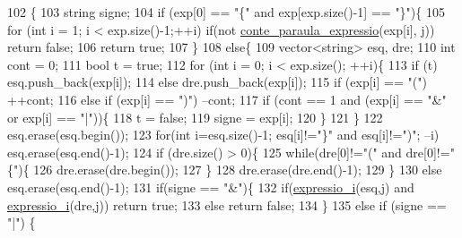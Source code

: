 \begin{DoxyCode}
102                                                       \{
103   \textcolor{keywordtype}{string} signe;
104   \textcolor{keywordflow}{if} (exp[0] == \textcolor{stringliteral}{"\{"} and exp[exp.size()-1] == \textcolor{stringliteral}{"\}"})\{
105     \textcolor{keywordflow}{for} (\textcolor{keywordtype}{int} i = 1; i < exp.size()-1;++i) \textcolor{keywordflow}{if}(not \hyperlink{class_cjt___frases_a2e262e5ddc41e193b8821d6ab48cd9f7}{conte\_paraula\_expressio}(exp[i], j))
       \textcolor{keywordflow}{return} \textcolor{keyword}{false};
106       \textcolor{keywordflow}{return} \textcolor{keyword}{true};
107   \}
108   \textcolor{keywordflow}{else}\{
109     vector<string> esq, dre;
110     \textcolor{keywordtype}{int} cont = 0;
111     \textcolor{keywordtype}{bool} t = \textcolor{keyword}{true};
112     \textcolor{keywordflow}{for} (\textcolor{keywordtype}{int} i = 0; i < exp.size(); ++i)\{
113       \textcolor{keywordflow}{if} (t) esq.push\_back(exp[i]);
114       \textcolor{keywordflow}{else} dre.push\_back(exp[i]);
115       \textcolor{keywordflow}{if} (exp[i] == \textcolor{stringliteral}{"("}) ++cont;
116       \textcolor{keywordflow}{else} \textcolor{keywordflow}{if} (exp[i] == \textcolor{stringliteral}{")"}) --cont;
117       \textcolor{keywordflow}{if} (cont == 1 and (exp[i] == \textcolor{stringliteral}{"&"} or exp[i] == \textcolor{stringliteral}{"|"}))\{
118         t = \textcolor{keyword}{false};
119         signe = exp[i];
120       \}
121     \}
122         esq.erase(esq.begin());
123     \textcolor{keywordflow}{for}(\textcolor{keywordtype}{int} i=esq.size()-1; esq[i]!=\textcolor{stringliteral}{"\}"} and esq[i]!=\textcolor{stringliteral}{")"}; --i) esq.erase(esq.end()-1);
124     \textcolor{keywordflow}{if} (dre.size() > 0)\{
125       \textcolor{keywordflow}{while}(dre[0]!=\textcolor{stringliteral}{"("} and dre[0]!=\textcolor{stringliteral}{"\{"})\{
126         dre.erase(dre.begin());
127       \}
128       dre.erase(dre.end()-1);
129     \}
130     \textcolor{keywordflow}{else} esq.erase(esq.end()-1);
131     \textcolor{keywordflow}{if}(signe == \textcolor{stringliteral}{"&"})\{
132       \textcolor{keywordflow}{if}(\hyperlink{class_cjt___frases_abb52ecadbfd3fead9e055c12f2947d04}{expressio\_i}(esq,j) and \hyperlink{class_cjt___frases_abb52ecadbfd3fead9e055c12f2947d04}{expressio\_i}(dre,j)) \textcolor{keywordflow}{return} \textcolor{keyword}{true};
133       \textcolor{keywordflow}{else} \textcolor{keywordflow}{return} \textcolor{keyword}{false};
134     \}
135     \textcolor{keywordflow}{else} \textcolor{keywordflow}{if} (signe == \textcolor{stringliteral}{"|"}) \{

\end{DoxyCode}
